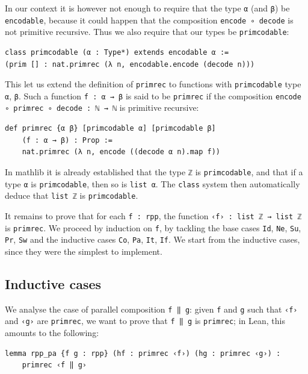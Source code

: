 \documentclass[preprint]{elsarticle}
\theoremstyle{remark}
\newcommand{\MATHLIB}{\textsf{mathlib}\xspace}
\newcommand{\LEAN}{\textsf{Lean}\xspace}
\begin{document}
In our context it is however not enough to require that the type \lstinline|α| (and \lstinline|β|) be \lstinline|encodable|, because it could happen that the composition \lstinline|encode ∘ decode| is not primitive recursive. Thus we also require that our types be \lstinline|primcodable|:

\begin{lstlisting}
class primcodable (α : Type*) extends encodable α :=
(prim [] : nat.primrec (λ n, encodable.encode (decode n)))
\end{lstlisting}

This let us extend the definition of \lstinline|primrec| to functions with \lstinline|primcodable| type \lstinline|α|, \lstinline|β|. Such a function \lstinline|f : α → β| is said to be \lstinline|primrec| if the composition \lstinline|encode ∘ primrec ∘ decode : ℕ → ℕ| is primitive recursive:

\begin{lstlisting}
def primrec {α β} [primcodable α] [primcodable β]
    (f : α → β) : Prop :=
    nat.primrec (λ n, encode ((decode α n).map f))
\end{lstlisting}

In \MATHLIB it is already established that the type \lstinline|ℤ| is \lstinline{primcodable}, and that if a type \lstinline|α| is \lstinline|primcodable|, then so is \lstinline|list α|. The \lstinline|class| system then automatically deduce that \lstinline|list ℤ| is \lstinline|primcodable|.

It remains to prove that for each \lstinline|f : rpp|, the function \lstinline|‹f› : list ℤ → list ℤ| is \lstinline|primrec|. We proceed by induction on \lstinline|f|, by tackling the base cases \lstinline|Id|, \lstinline|Ne|, \lstinline|Su|, \lstinline|Pr|, \lstinline|Sw| and the inductive cases \lstinline|Co|, \lstinline|Pa|, \lstinline|It|, \lstinline|If|. We start from the inductive cases, since they were the simplest to implement.

\subsection{Inductive cases}

We analyse the case of parallel composition \lstinline|f ‖ g|: given \lstinline|f| and \lstinline|g| such that \lstinline|‹f›| and \lstinline|‹g›| are \lstinline|primrec|, we want to prove that \lstinline|f ‖ g| is \lstinline|primrec|; in \LEAN, this amounts to the following:

\begin{lstlisting}
lemma rpp_pa {f g : rpp} (hf : primrec ‹f›) (hg : primrec ‹g›) :
    primrec ‹f ‖ g›
\end{lstlisting}
\end{document}
